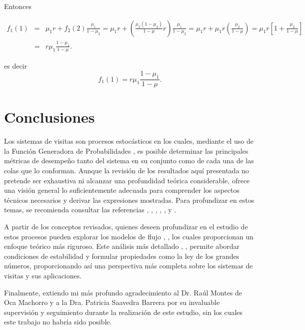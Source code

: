 \documentclass{article}
\numberwithin{equation}{section}
\begin{document}
Entonces

\begin{eqnarray*}
f_{1}\left(1\right)&=&\mu_{1}r+f_{2}\left(2\right)\frac{\mu_{1}}{1-\mu_{2}}=\mu_{1}r+\left(\frac{\mu_{2}\left(1-\mu_{2}\right)}{1-\mu}r\right)\frac{\mu_{1}}{1-\mu_{2}}=\mu_{1}r+\mu_{1}r\left(\frac{\mu_{2}}{1-\mu}\right)=\mu_{1}r\left[1+\frac{\mu_{2}}{1-\mu}\right]\\
&=&r\mu_{1}\frac{1-\mu_{1}}{1-\mu}.
\end{eqnarray*}

es decir
\begin{equation}
f_{1}\left(1\right)=r\mu_{1}\frac{1-\mu_{1}}{1-\mu}.
\end{equation}

\section*{Conclusiones}
Los sistemas de visitas son procesos estoc\'asticos en los cuales, mediante el uso de la Funci\'on Generadora de Probabilidades \cite{Adan}, es posible determinar las principales m\'etricas de desempe\~no tanto del sistema en su conjunto como de cada una de las colas que lo conforman. Aunque la revisi\'on de los resultados aqu\'i presentada no pretende ser exhaustiva ni alcanzar una profundidad te\'orica considerable, ofrece una visi\'on general lo suficientemente adecuada para comprender los aspectos t\'ecnicos necesarios y derivar las expresiones mostradas. Para profundizar en estos temas, se recomienda consultar las referencias \cite{BosBoon}, \cite{BoonMeiWinands}, \cite{Boxma}, \cite{LevySidi}, \cite{Roubos}, y \cite{Semenova}.

A partir de los conceptos revisados, quienes deseen profundizar en el estudio de estos procesos pueden explorar los modelos de flujo \cite{Down}, \cite{KaspiMandelbaum}, los cuales proporcionan un enfoque te\'orico m\'as riguroso. Este an\'alisis m\'as detallado \cite{Asmussen}, \cite{Daley68}, \cite{KaspiMandelbaum} permite abordar condiciones de estabilidad y formular propiedades como la ley de los grandes n\'umeros, proporcionando as\'i una perspectiva m\'as completa sobre los sistemas de visitas y sus aplicaciones.

Finalmente, extiendo mi m\'as profundo agradecimiento al Dr. Ra\'ul Montes de Oca Machorro y a la Dra. Patricia Saavedra Barrera por su invaluable supervisi\'on y seguimiento durante la realizaci\'on de este estudio, sin los cuales este trabajo no habr\'ia sido posible.
\end{document}
